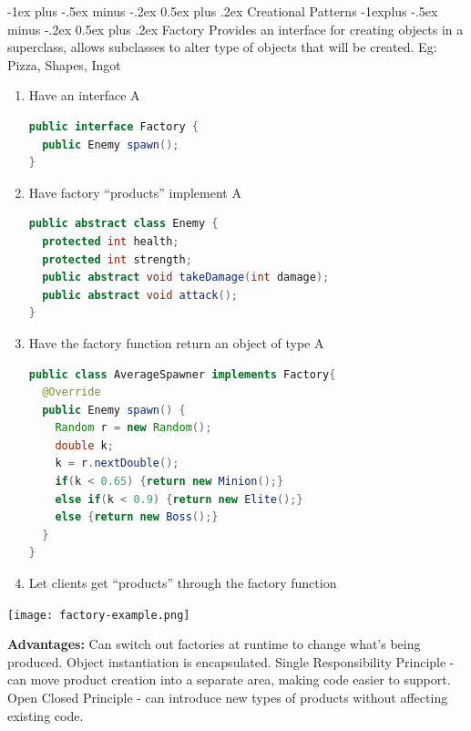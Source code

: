 \documentclass[letterpaper, 8pt]{extarticle}
\makeatletter
\renewcommand{\section}{\@startsection{section}{1}{0mm}%
                                {-1ex plus -.5ex minus -.2ex}%
                                {0.5ex plus .2ex}%
                                {\normalfont\normalsize\bfseries}}
\renewcommand{\subsection}{\@startsection{subsection}{2}{0mm}%
                                {-1explus -.5ex minus -.2ex}%
                                {0.5ex plus .2ex}%
                                {\normalfont\small\bfseries}}
\makeatother
\begin{document}
\begin{multicols*}{5}
  \section{Creational Patterns}
  \subsection{Factory}
  Provides an interface for creating objects in a superclass,
  allows subclasses to alter type of objects that will be created.
  Eg: Pizza, Shapes, Ingot
  \begin{enumerate}
    \item Have an interface A
          \begin{lstlisting}[language=Java, breaklines=true]
public interface Factory {
  public Enemy spawn();
}
        \end{lstlisting}
    \item Have factory ``products'' implement A
          \begin{lstlisting}[language=Java, breaklines=true]
public abstract class Enemy {
  protected int health;
  protected int strength;
  public abstract void takeDamage(int damage);
  public abstract void attack();
}
        \end{lstlisting}
    \item Have the factory function return an object of type A
          \begin{lstlisting}[language=Java, breaklines=true]
public class AverageSpawner implements Factory{
  @Override
  public Enemy spawn() {
    Random r = new Random();
    double k;
    k = r.nextDouble();
    if(k < 0.65) {return new Minion();}
    else if(k < 0.9) {return new Elite();}
    else {return new Boss();}
  }
}
        \end{lstlisting}
    \item Let clients get ``products'' through the factory function
  \end{enumerate}

  \begin{center}
    \texttt{[image: factory-example.png]}
  \end{center}

  \textbf{Advantages:}
  Can switch out factories at runtime to change what's being produced.
  Object instantiation is encapsulated.
  Single Responsibility Principle - can move product creation into a separate area,
  making code easier to support.
  Open Closed Principle - can introduce new types of products without
  affecting existing code.


\end{multicols*}
\end{document}
